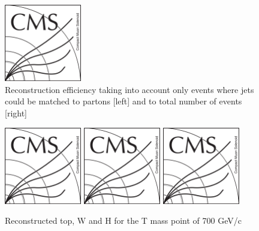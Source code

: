 \begin{figure}[!Hhtbp]
  \begin{center}
    \includegraphics[width=0.3\textwidth]{figs/CMSlogo.png}
    \caption{Reconstruction efficiency taking into account only events where jets could be matched to partons [left] and to total number of events [right]}
    \label{fig:RecEff}
  \end{center}
\end{figure}\clearpage

\begin{figure}[!Hhtbp]
  \begin{center}
    \includegraphics[width=0.3\textwidth]{figs/CMSlogo.png}
    \includegraphics[width=0.3\textwidth]{figs/CMSlogo.png}
    \includegraphics[width=0.3\textwidth]{figs/CMSlogo.png}
    \caption{Reconstructed top, W and H for the T mass point of 700 GeV/c}
    \label{fig:WHt}
  \end{center}
\end{figure}\clearpage

